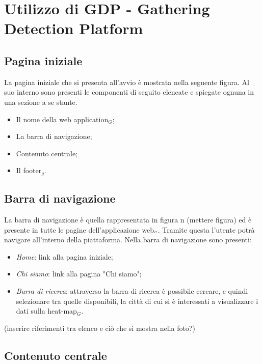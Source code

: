\chapter{Utilizzo di GDP - Gathering Detection Platform}\label{UtilizzoDiGDPGatheringDetecionPlatform}

\section{Pagina iniziale}\label{UtilizzoDiGDPGatheringDetecionPlatformPaginaIniziale}
La pagina iniziale che si presenta all'avvio è mostrata nella seguente figura.
Al suo interno sono presenti le componenti di seguito elencate e spiegate ognuna in una sezione a se stante.
\begin{itemize}
	\item Il nome della web application$_G$;
	\item La barra di navigazione;
	\item Contenuto centrale;
	\item Il footer$_g$.
\end{itemize}

\section{Barra di navigazione}\label{UtilizzoDiGDPGatheringDetecionPlatformBarraDiNavigazione}

La barra di navigazione è quella rappresentata in figura n (mettere figura) ed è presente in tutte le pagine dell'applicazione web$_{\scaleto{G}{3pt}}$. Tramite questa l'utente potrà navigare all'interno della piattaforma. Nella barra di navigazione sono presenti:
\begin{itemize}
	\item \textit{Home}: link alla pagina iniziale;
	\item \textit{Chi siamo}: link alla pagina "Chi siamo";
	\item \textit{Barra di ricerca}: attraverso la barra di ricerca è possibile cercare, e quindi selezionare tra quelle disponibili, la città di cui si è interessati a visualizzare i dati sulla heat-map$_G$. 
\end{itemize}
(inserire riferimenti tra elenco e ciò che si mostra nella foto?)

\section{Contenuto centrale}\label{UtilizzoDiGDPGatheringDetecionPlatformContenutoCentrale}
